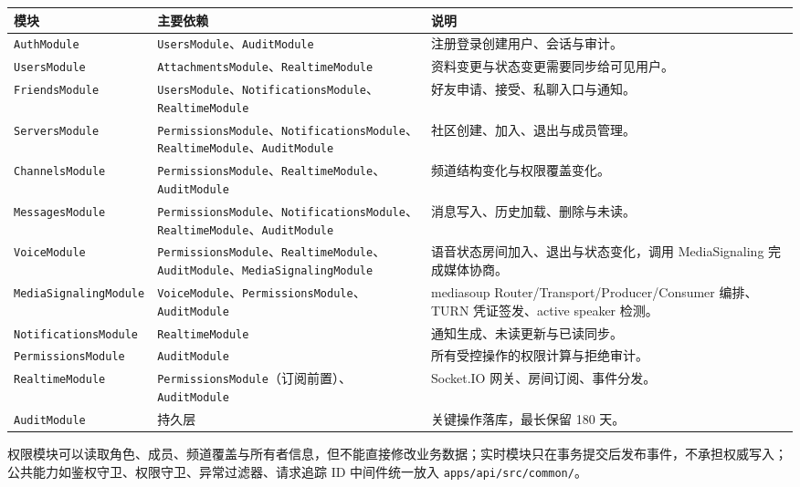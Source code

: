 \noindent\begin{tabularx}{\textwidth}{L{2.8cm}L{4cm}Y}
  \toprule
  模块 & 主要依赖 & 说明 \\
  \midrule
  \texttt{AuthModule} & \texttt{UsersModule}、\texttt{AuditModule} & 注册登录创建用户、会话与审计。 \\
  \texttt{UsersModule} & \texttt{AttachmentsModule}、\texttt{RealtimeModule} & 资料变更与状态变更需要同步给可见用户。 \\
  \texttt{FriendsModule} & \texttt{UsersModule}、\texttt{NotificationsModule}、\texttt{RealtimeModule} & 好友申请、接受、私聊入口与通知。 \\
  \texttt{ServersModule} & \texttt{PermissionsModule}、\texttt{NotificationsModule}、\texttt{RealtimeModule}、\texttt{AuditModule} & 社区创建、加入、退出与成员管理。 \\
  \texttt{ChannelsModule} & \texttt{PermissionsModule}、\texttt{RealtimeModule}、\texttt{AuditModule} & 频道结构变化与权限覆盖变化。 \\
  \texttt{MessagesModule} & \texttt{PermissionsModule}、\texttt{NotificationsModule}、\texttt{RealtimeModule}、\texttt{AuditModule} & 消息写入、历史加载、删除与未读。 \\
  \texttt{VoiceModule} & \texttt{PermissionsModule}、\texttt{RealtimeModule}、\texttt{AuditModule}、\texttt{MediaSignalingModule} & 语音状态房间加入、退出与状态变化，调用 MediaSignaling 完成媒体协商。 \\
  \texttt{MediaSignalingModule} & \texttt{VoiceModule}、\texttt{PermissionsModule}、\texttt{AuditModule} & mediasoup Router/Transport/Producer/Consumer 编排、TURN 凭证签发、active speaker 检测。 \\
  \texttt{NotificationsModule} & \texttt{RealtimeModule} & 通知生成、未读更新与已读同步。 \\
  \texttt{PermissionsModule} & \texttt{AuditModule} & 所有受控操作的权限计算与拒绝审计。 \\
  \texttt{RealtimeModule} & \texttt{PermissionsModule}（订阅前置）、\texttt{AuditModule} & Socket.IO 网关、房间订阅、事件分发。 \\
  \texttt{AuditModule} & 持久层 & 关键操作落库，最长保留 180 天。 \\
  \bottomrule
\end{tabularx}

权限模块可以读取角色、成员、频道覆盖与所有者信息，但不能直接修改业务数据；实时模块只在事务提交后发布事件，不承担权威写入；公共能力如鉴权守卫、权限守卫、异常过滤器、请求追踪 ID 中间件统一放入 \texttt{apps/api/src/common/}。

